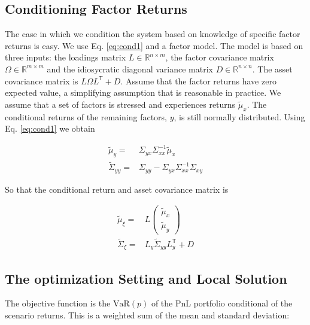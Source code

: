 \documentclass[letter, 12pt]{article}
\newcommand{\transpose}{^\mathsf{T}}
\newcommand{\R}{\mathbb{R}}
\newcommand{\inv}{^{-1}}
\begin{document}
\subsection{Conditioning Factor Returns}
The case in which we condition the system based on knowledge of specific factor returns is easy. We use Eq. \ref{eq:cond1} and a factor model. The model is based on three inputs: the loadings matrix $L\in\R^{n\times m}$, the factor covariance matrix $\Omega\in\R^{m\times m}$ and the idiosycratic diagonal variance matrix $D\in\R^{n\times n}$. The asset covariance matrix is $L\Omega L\transpose + D$. Assume that the factor returns have zero expected value, a simplifying assumption that is reasonable in practice. We assume that a set of factors is stressed and experiences returns $\tilde \mu_x$. The conditional returns of the remaining factors, $y$, is still normally distributed. Using Eq. \ref{eq:cond1} we obtain

\begin{align*}
\tilde\mu_y=& \Sigma_{yx} \Sigma_{xx}\inv \tilde \mu_x \\
\tilde\Sigma_{yy} =& \Sigma_{yy} - \Sigma_{yx} \Sigma_{xx}\inv \Sigma_{xy}
\end{align*}

So that the conditional return and asset covariance matrix is

\begin{align*}
\tilde\mu_\xi = & L \left(
\begin{array}{c}
\tilde\mu_x\\
\tilde\mu_y
\end{array}
\right) \\
\tilde\Sigma_\xi = & L_y \tilde\Sigma_{yy} L_y\transpose + D
\end{align*}
%
%
%
\subsection{The optimization Setting and Local Solution}
The objective function is the $\text{VaR}(p)$ of the  PnL portfolio conditional of the scenario returns. This is a weighted sum of the mean and standard deviation:
\end{document}
